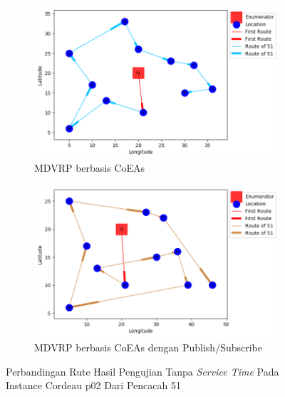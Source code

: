 \begin{figure}[H]
	\centering
	\begin{subfigure}[t]{\textwidth}
		\centering
		\includegraphics[width=\textwidth]{Resources/Images/cordeau_p02/cordeau_p02_notw_51_coes}
		\caption{MDVRP berbasis CoEAs}
		\label{fig:cordeau_p02_notw_51_coes}
	\end{subfigure}
	\begin{subfigure}[t]{\textwidth}
		\centering
		\includegraphics[width=\textwidth]{Resources/Images/cordeau_p02/cordeau_p02_notw_51_pubsub_coes}
		\caption{MDVRP berbasis CoEAs dengan Publish/Subscribe}
		\label{fig:cordeau_p02_notw_51_pubsub_coes}
	\end{subfigure}
	\caption{Perbandingan Rute Hasil Pengujian Tanpa \textit{Service Time} Pada Instance Cordeau p02 Dari Pencacah 51}
	\label{fig:cordeau_p02_notw_51}
\end{figure}



